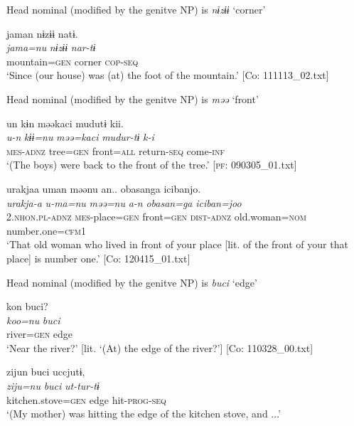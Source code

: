   Head nominal (modified by the genitve NP) is \textit{nɨzɨɨ} ‘corner’

\ex
{\TM}
\glll jaman  nɨzɨɨ  natɨ.\\
\textit{jama=nu}  \textit{nɨzɨɨ}  \textit{nar-tɨ}\\
mountain=\textsc{gen}  corner  \textsc{cop}-\textsc{seq}\\
\glt ‘Since (our house) was (at) the foot of the mountain.’ [Co: 111113\_02.txt]

  Head nominal (modified by the genitve NP) is \textit{məə} ‘front’

\ex
{\TM}
\glll  un  kɨn  məəkaci  mudutɨ  kii.\\
\textit{u-n}  \textit{kɨɨ=nu}  \textit{məə=kaci}  \textit{mudur-tɨ}  \textit{k-i}\\
\textsc{mes}-\textsc{adnz}  tree=\textsc{gen}  front=\textsc{all}  return-\textsc{seq}  come-\textsc{inf}\\
\glt ‘(The boys) were back to the front of the tree.’ [\textsc{pf}: 090305\_01.txt]

\ex
{\TM}
\glll urakjaa  uman  məənu  an..   {\textbar}obasan{\textbar}ga  {\textbar}iciban{\textbar}jo.\\
\textit{urakja-a}  \textit{u-ma=nu}  \textit{məə=nu}  \textit{a-n}   \textit{obasan=ga}  \textit{iciban=joo}\\
2.\textsc{nhon}.\textsc{pl}-\textsc{adnz}  \textsc{mes}-place=\textsc{gen}  front=\textsc{gen}  \textsc{dist}-\textsc{adnz}  old.woman=\textsc{nom}  number.one=\textsc{cfm}1\\
\glt ‘That old woman who lived in front of your place [lit. of the front of your that place] is number one.’ [Co: 120415\_01.txt]

  Head nominal (modified by the genitve NP) is \textit{buci} ‘edge’

\ex
{\TM}
\glll kon  buci?\\
\textit{koo=nu}  \textit{buci}\\
      river=\textsc{gen}  edge\\
\glt ‘Near the river?’ [lit. ‘(At) the edge of the river?’]      [Co: 110328\_00.txt]

\glll zijun  buci  uccjutɨ,\\
      \textit{ziju=nu}  \textit{buci}  \textit{ut-tur-tɨ}\\
      kitchen.stove=\textsc{gen}  edge  hit-\textsc{prog}-\textsc{seq}\\
\glt ‘(My mother) was hitting the edge of the kitchen stove, and ...’
\z
\z

